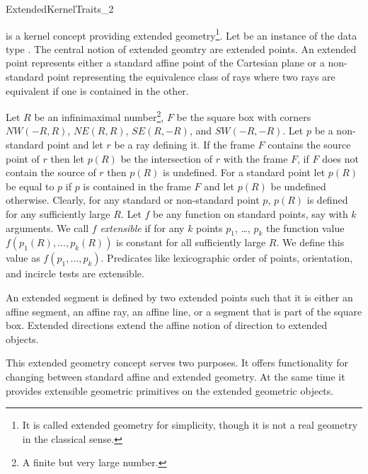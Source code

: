 
\begin{ccRefConcept}{ExtendedKernelTraits_2}

\ccDefinition

 is a kernel concept providing extended
geometry\footnote{It is called extended geometry for simplicity,
though it is not a real geometry in the classical sense.}. Let 
be an instance of the data type .  The
central notion of extended geomtry are extended points. An extended
point represents either a standard affine point of the Cartesian plane
or a non-standard point representing the equivalence class of rays
where two rays are equivalent if one is contained in the other.

Let $R$ be an infinimaximal number\footnote{A finite but very large
number.}, $F$ be the square box with corners $NW(-R,R)$, $NE(R,R)$,
$SE(R,-R)$, and $SW(-R,-R)$. Let $p$ be a non-standard point and let
$r$ be a ray defining it. If the frame $F$ contains the source point
of $r$ then let $p(R)$ be the intersection of $r$ with the frame $F$,
if $F$ does not contain the source of $r$ then $p(R)$ is undefined.
For a standard point let $p(R)$ be equal to $p$ if $p$ is contained in
the frame $F$ and let $p(R)$ be undefined otherwise. Clearly, for any
standard or non-standard point $p$, $p(R)$ is defined for any
sufficiently large $R$. Let $f$ be any function on standard points,
say with $k$ arguments. We call $f$ {\em extensible} if for any $k$
points $p_1$, \ldots, $p_k$ the function value
$f(p_1(R),\ldots,p_k(R))$ is constant for all sufficiently large
$R$. We define this value as $f(p_1,\ldots,p_k)$.  Predicates like
lexicographic order of points, orientation, and incircle tests are
extensible.

An extended segment is defined by two extended points such that it is
either an affine segment, an affine ray, an affine line, or a segment
that is part of the square box. Extended directions extend the affine
notion of direction to extended objects.

This extended geometry concept serves two purposes. It offers
functionality for changing between standard affine and extended
geometry. At the same time it provides extensible geometric primitives
on the extended geometric objects.

\ccSetOneOfTwoColumns{7cm}

\ccTypes


\end{ccRefConcept}
